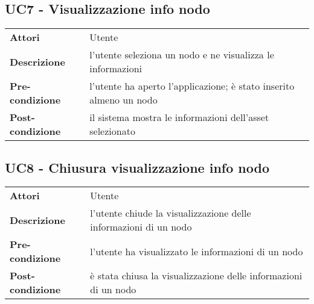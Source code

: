 \subsection{UC7 - Visualizzazione info nodo}
\label{sssec:UC7}
\def\arraystretch{1.5}
\begin{tabularx}{\textwidth}{l|p{}}
\rowcolor{I} \multicolumn{2}{c}{\color{white}\textbf{UC7 - Visualizzazione info nodo}} \\
\toprule
\endhead
\textbf{Attori} & Utente\\
\textbf{Descrizione} & l'utente seleziona un nodo e ne visualizza le informazioni\\
\textbf{Pre-condizione} & l'utente ha aperto l'applicazione; è stato inserito almeno un nodo\\
\textbf{Post-condizione} & il sistema mostra le informazioni dell'asset selezionato\\
\bottomrule
\end{tabularx}
\subsection{UC8 - Chiusura visualizzazione info nodo}
\label{sssec:UC8}
\def\arraystretch{1.5}
\begin{tabularx}{\textwidth}{l|p{}}
\rowcolor{I} \multicolumn{2}{c}{\color{white}\textbf{UC8 - Chiusura visualizzazione info nodo}} \\
\toprule
\endhead
\textbf{Attori} & Utente\\
\textbf{Descrizione} & l'utente chiude la visualizzazione delle informazioni di un nodo\\
\textbf{Pre-condizione} & l'utente ha visualizzato le informazioni di un nodo\\
\textbf{Post-condizione} & è stata chiusa la visualizzazione delle informazioni di un nodo\\
\bottomrule
\end{tabularx}
